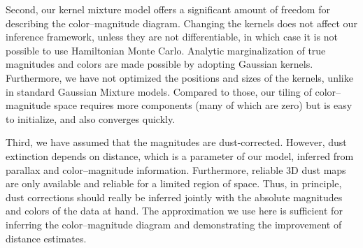 \documentclass[manuscript, letterpaper]{aastex6}
\makeatletter
\let\origsection\section
\renewcommand\section{\@ifstar{\starsection}{\nostarsection}}
\newcommand\nostarsection[1]{\sectionprelude\origsection{#1}}
\newcommand\starsection[1]{\sectionprelude\origsection*{#1}}
\newcommand\sectionprelude{\vspace{1em}}
\makeatother
\begin{document}
Second, our kernel mixture model offers a significant amount of freedom for describing the color--magnitude diagram.
Changing the kernels does not affect our inference framework, unless they are not differentiable, in which case it is not possible to use Hamiltonian Monte Carlo.
Analytic marginalization of true magnitudes and colors are made possible by adopting Gaussian kernels. 
Furthermore, we have not optimized the positions and sizes of the kernels, unlike in standard Gaussian Mixture models. 
Compared to those, our tiling of color--magnitude space requires more components (many of which are zero) but is easy to initialize, and also converges quickly. 

Third, we have assumed that the magnitudes are dust-corrected. 
However, dust extinction depends on distance, which is a parameter of our model, inferred from parallax and color--magnitude information.
Furthermore, reliable 3D dust maps are only available and reliable for a limited region of space.
Thus, in principle, dust corrections should really be inferred jointly with the absolute magnitudes and colors of the data at hand. 
The approximation we use here is sufficient for inferring the color--magnitude diagram and demonstrating the improvement of distance estimates.

\section{Application to Gaia TGAS}\label{sec:application}
\end{document}

